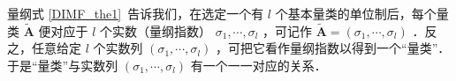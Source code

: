 
量纲式
\autoref{DIMF_the1}~告诉我们，在选定一个有 $l$ 个基本量类的单位制后，每个量类 $\tilde{\boldsymbol{A}}$ 便对应于 $l$ 个实数（量纲指数） $\sigma_1,\cdots,\sigma_l$ ，可记作 $\tilde{\boldsymbol{A}}=(\sigma_1,\cdots,\sigma_l)$ ．反之，任意给定 $l$ 个实数列 $(\sigma_1,\cdots,\sigma_l)$ ，可把它看作量纲指数以得到一个“量类”．于是“量类”与实数列 $(\sigma_1,\cdots,\sigma_l)$ 有一个一一对应的关系．